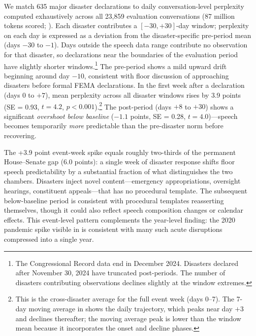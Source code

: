 \documentclass[12pt]{article}
\begin{document}
We match 635 major disaster declarations to daily conversation-level perplexity computed exhaustively across all 23,859 evaluation conversations (87 million tokens scored; ). Each disaster contributes a $[-30, +30]$-day window; perplexity on each day is expressed as a deviation from the disaster-specific pre-period mean (days $-30$ to $-1$). Days outside the speech data range contribute no observation for that disaster, so declarations near the boundaries of the evaluation period have slightly shorter windows.\footnote{The Congressional Record data end in December 2024. Disasters declared after November 30, 2024 have truncated post-periods. The number of disasters contributing observations declines slightly at the window extremes.} The pre-period shows a mild upward drift beginning around day $-10$, consistent with floor discussion of approaching disasters before formal FEMA declarations. In the first week after a declaration (days 0 to $+7$), mean perplexity across all disaster windows rises by 3.9 points (SE = 0.93, $t = 4.2$, $p < 0.001$).\footnote{This is the cross-disaster average for the full event week (days 0--7). The 7-day moving average in  shows the daily trajectory, which peaks near day $+3$ and declines thereafter; the moving average peak is lower than the window mean because it incorporates the onset and decline phases.} The post-period (days $+8$ to $+30$) shows a significant \textit{overshoot below baseline} ($-1.1$ points, SE = 0.28, $t = 4.0$)---speech becomes temporarily \textit{more} predictable than the pre-disaster norm before recovering.

The +3.9 point event-week spike equals roughly two-thirds of the permanent House--Senate gap (6.0 points): a single week of disaster response shifts floor speech predictability by a substantial fraction of what distinguishes the two chambers. Disasters inject novel content---emergency appropriations, oversight hearings, constituent appeals---that has no procedural template. The subsequent below-baseline period is consistent with procedural templates reasserting themselves, though it could also reflect speech composition changes or calendar effects. This event-level pattern complements the year-level finding: the 2020 pandemic spike visible in  is consistent with many such acute disruptions compressed into a single year.


\end{document}
